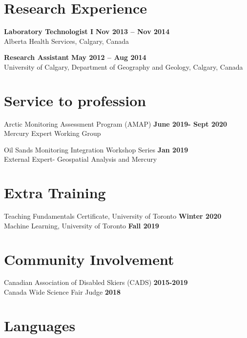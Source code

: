 \documentclass[margin,line]{res}
\begin{document}
\begin{resume}
\vspace*{.1in}

\section{\sc Research Experience}
\textbf{Laboratory Technologist I}
\hfill {\bf  Nov 2013 – Nov 2014}\\
Alberta Health Services, Calgary, Canada

\textbf{Research Assistant}
\hfill {\bf  May 2012 – Aug 2014}\\
University of Calgary, Department of Geography and Geology, Calgary, Canada

\vspace*{.1in}

\section{\sc Service to profession}
Arctic Monitoring Assessment Program (AMAP)
\hfill {\bf  June 2019- Sept 2020}\\
Mercury Expert Working Group

Oil Sands Monitoring Integration Workshop Series
\hfill {\bf  Jan 2019}\\
External Expert- Geospatial Analysis and Mercury

\vspace*{.1in}

\section{\sc Extra Training}
Teaching Fundamentals Certificate, University of Toronto
\hfill {\bf  Winter 2020}\\
Machine Learning, University of Toronto
\hfill {\bf  Fall 2019}

\vspace*{.1in}

\section{\sc Community Involvement}
Canadian Association of Disabled Skiers (CADS)
\hfill {\bf  2015-2019}\\
Canada Wide Science Fair Judge
\hfill {\bf  2018}

\vspace*{.1in}

\section{\sc Languages}


\end{resume}
\end{document}
